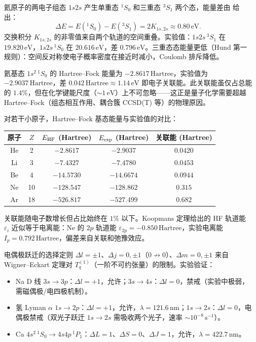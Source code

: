 氦原子的两电子组态 $1s2s$ 产生单重态 $^1S_0$ 和三重态 $^3S_1$ 两个态，能量差由 给出：
\[
 \Delta E=E(^1S_0)-E(^3S_1)=2K_{1s,2s}\approx0.80\,\mathrm{eV}.
\]
交换积分 $K_{1s,2s}$ 的非零值来自两个轨道的空间重叠。实验值：$1s2s\,^3S_1$ 在 $19.820\,\mathrm{eV}$，$1s2s\,^1S_0$ 在 $20.616\,\mathrm{eV}$，差 $0.796\,\mathrm{eV}$。三重态态能量更低（Hund 第一规则）：空间反对称使电子概率密度在接近时减小，Coulomb 排斥降低。

氦基态 $1s^2\,^1S_0$ 的 Hartree--Fock 能量为 $-2.8617\,\mathrm{Hartree}$，实验值为 $-2.9037\,\mathrm{Hartree}$，差 $0.042\,\mathrm{Hartree}\approx1.14\,\mathrm{eV}$ 即电子关联能。此关联能虽仅占总能的 $1.4\%$，但在化学键能尺度（$\sim1\,\mathrm{eV}$）上不可忽略——这正是量子化学需要超越 Hartree--Fock（组态相互作用、耦合簇 CCSD(T) 等）的物理原因。

对若干小原子，Hartree--Fock 基态能量与实验值的对比：
\begin{center}
\begin{tabular}{ccccc}
\hline
原子 & $Z$ & $E_{\rm HF}$ (Hartree) & $E_{\rm exp}$ (Hartree) & 关联能 (Hartree) \\
\hline
He & 2 & $-2.8617$ & $-2.9037$ & $0.0420$ \\
Li & 3 & $-7.4327$ & $-7.4780$ & $0.0453$ \\
Be & 4 & $-14.5730$ & $-14.6674$ & $0.0944$ \\
Ne & 10 & $-128.547$ & $-128.862$ & $0.315$ \\
Ar & 18 & $-526.817$ & $-527.499$ & $0.682$ \\
\hline
\end{tabular}
\end{center}
关联能随电子数增长但占比始终在 $1\%$ 以下。Koopmans 定理给出的 HF 轨道能 $\varepsilon_i$ 近似等于电离能：Ne 的 $2p$ 轨道能 $\varepsilon_{2p}=-0.850\,\mathrm{Hartree}$，实验电离能 $I_p=0.792\,\mathrm{Hartree}$，偏差来自关联和弛豫效应。

电偶极跃迁的选择定则 $\Delta l=\pm1$、$\Delta j=0,\pm1$（$0\not\to0$）、$\Delta m=0,\pm1$ 来自 Wigner--Eckart 定理对 $T^{(1)}_q$（一阶不可约张量）的限制。实验验证：
\begin{itemize}
 \item Na D 线 $3s\to3p$：$\Delta l=+1$，允许；$3s\to4s$：$\Delta l=0$，禁戒（实验中极弱，需磁偶极/电四极机制）。
 \item 氢 Lyman $\alpha$ $1s\to2p$：$\Delta l=+1$，允许，$\lambda=121.6\,\mathrm{nm}$；$1s\to2s$：$\Delta l=0$，电偶极禁戒（双光子跃迁 $1s\to2s$ 需吸收两个光子，速率 $\sim10^{-8}\,\mathrm{s}^{-1}$）。
 \item Ca $4s^2\,^1S_0\to4s4p\,^1P_1$：$\Delta L=1$、$\Delta S=0$、$\Delta J=1$，允许，$\lambda=422.7\,\mathrm{nm}$。
\end{itemize}

